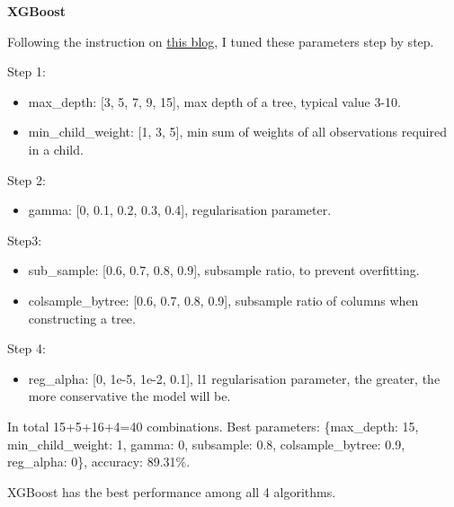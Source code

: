 \documentclass[12pt]{article}
\begin{document}
\textbf{XGBoost}

Following the instruction on \href{https://www.analyticsvidhya.com/blog/2016/03/complete-guide-parameter-tuning-xgboost-with-codes-python/}{this blog}, I tuned these parameters step by step.

Step 1:
\begin{itemize}
    \item max\_depth: [3, 5, 7, 9, 15], max depth of a tree, typical value 3-10.
    \item min\_child\_weight: [1, 3, 5], min sum of weights of all observations required in a child.
\end{itemize}

Step 2:
\begin{itemize}
    \item gamma: [0, 0.1, 0.2, 0.3, 0.4], regularisation parameter.
\end{itemize}

Step3:
\begin{itemize}
    \item sub\_sample: [0.6, 0.7, 0.8, 0.9], subsample ratio, to prevent overfitting.
    \item colsample\_bytree: [0.6, 0.7, 0.8, 0.9], subsample ratio of columns when constructing a tree.
\end{itemize}

Step 4:
\begin{itemize}
    \item reg\_alpha: [0, 1e-5, 1e-2, 0.1], l1 regularisation parameter, the greater, the more conservative the model will be.
\end{itemize}

In total 15+5+16+4=40 combinations. Best parameters: \{max\_depth: 15, min\_child\_weight: 1, gamma: 0, subsample: 0.8, colsample\_bytree: 0.9, reg\_alpha: 0\}, accuracy: 89.31\%.

XGBoost has the best performance among all 4 algorithms.
\end{document}
